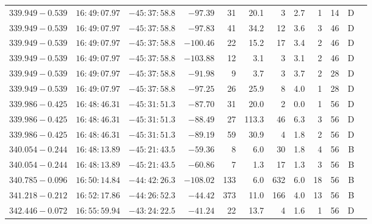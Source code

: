 {\begin{longtable}{c rrr rrrrr rr c}
    $339.949-0.539$     &   $16:49:07.97$     &   $-45:37:58.8$     &   $-97.39  $    &   31     &   20.1    &    3   &   2.7 &   1   &   14  &   D   \\
    $339.949-0.539$     &   $16:49:07.97$     &   $-45:37:58.8$     &   $-97.83  $    &   41     &   34.2    &    12  &   3.6 &   3   &   46  &   D   \\
    $339.949-0.539$     &   $16:49:07.97$     &   $-45:37:58.8$     &   $-100.46 $    &   22     &   15.2    &    17  &   3.4 &   2   &   46  &   D   \\
    $339.949-0.539$     &   $16:49:07.97$     &   $-45:37:58.8$     &   $-103.88 $    &   12     &    3.1    &    3   &   3.1 &   2   &   46  &   D   \\
    $339.949-0.539$     &   $16:49:07.97$     &   $-45:37:58.8$     &   $-91.98  $    &   9      &    3.7    &    3   &   3.7 &   2   &   28  &   D   \\
    $339.949-0.539$     &   $16:49:07.97$     &   $-45:37:58.8$     &   $-97.25  $    &   26     &   25.9    &    8   &   4.0 &   1   &   28  &   D   \\
    $339.986-0.425$     &   $16:48:46.31$     &   $-45:31:51.3$     &   $-87.70  $    &   31     &   20.0    &    2   &   0.0 &   1   &   56  &   D   \\
    $339.986-0.425$     &   $16:48:46.31$     &   $-45:31:51.3$     &   $-88.49  $    &   27     &  113.3    &    46  &   6.3 &   3   &   56  &   D   \\
    $339.986-0.425$     &   $16:48:46.31$     &   $-45:31:51.3$     &   $-89.19  $    &   59     &   30.9    &    4   &   1.8 &   2   &   56  &   D   \\
    $340.054-0.244$     &   $16:48:13.89$     &   $-45:21:43.5$     &   $-59.36  $    &   8      &    6.0    &    30  &   1.8 &   4   &   56  &   B   \\
    $340.054-0.244$     &   $16:48:13.89$     &   $-45:21:43.5$     &   $-60.86  $    &   7      &    1.3    &    17  &   1.3 &   3   &   56  &   B   \\
    $340.785-0.096$     &   $16:50:14.84$     &   $-44:42:26.3$     &   $-108.02 $    &   133    &    6.0    &    632 &   6.0 &   18  &   56  &   B   \\
    $341.218-0.212$     &   $16:52:17.86$     &   $-44:26:52.3$     &   $-44.42  $    &   373    &   11.0    &    166 &   4.0 &   13  &   56  &   B   \\
    $342.446-0.072$     &   $16:55:59.94$     &   $-43:24:22.5$     &   $-41.24  $    &   22     &   13.7    &    4   &   1.6 &   1   &   56  &   D   \\

\end{longtable}}
